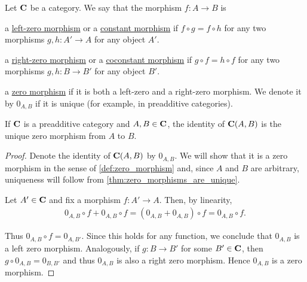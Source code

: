 \begin{definition}\label{def:zero_morphism}
  Let $\operatorname{\mathbf{C}}$ be a category. We say that the morphism $f: A \to B$ is
  \begin{defenum}
    \item\label{def:zero_morphism/left} a \uline{left-zero morphism} or a \uline{constant morphism} if $f \circ g = f \circ h$ for any two morphisms $g, h: A' \to A$ for any object $A'$.
    \item\label{def:zero_morphism/right} a \uline{right-zero morphism} or a \uline{coconstant morphism} if $g \circ f = h \circ f$ for any two morphisms $g, h: B \to B'$ for any object $B'$.
    \item\label{def:zero_morphism/bidirectional} a \uline{zero morphism} if it is both a left-zero and a right-zero morphism. We denote it by $0_{A,B}$ if it is unique (for example, in preadditive categories).
  \end{defenum}
\end{definition}

\begin{proposition}\label{def:preadditive_zero_morphisms}
  If $\operatorname{\mathbf{C}}$ is a preadditive category and $A, B \in \operatorname{\mathbf{C}}$, the identity of $\operatorname{\mathbf{C}}(A, B)$ is the unique zero morphism from $A$ to $B$.
\end{proposition}
\begin{proof}
  Denote the identity of $\operatorname{\mathbf{C}}(A, B)$ by $0_{A,B}$. We will show that it is a zero morphism in the sense of \cref{def:zero_morphism} and, since $A$ and $B$ are arbitrary, uniqueness will follow from \cref{thm:zero_morphisms_are_unique}.

  Let $A' \in \operatorname{\mathbf{C}}$ and fix a morphism $f: A' \to A$. Then, by linearity,
  \begin{align*}
    0_{A,B} \circ f + 0_{A,B} \circ f
    =
    (0_{A,B} + 0_{A,B}) \circ f
    =
    0_{A,B} \circ f.
  \end{align*}

  Thus $0_{A,B} \circ f = 0_{A,B'}$. Since this holds for any function, we conclude that $0_{A,B}$ is a left zero morphism. Analogously, if $g: B \to B'$ for some $B' \in \operatorname{\mathbf{C}}$, then $g \circ 0_{A,B} = 0_{B,B'}$ and thus $0_{A,B}$ is also a right zero morphism. Hence $0_{A,B}$ is a zero morphism.
\end{proof}

